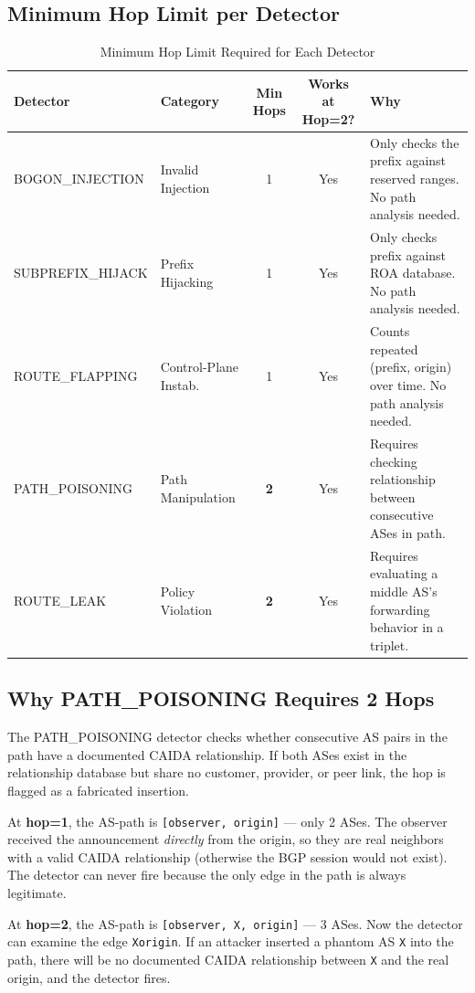 \documentclass[11pt,a4paper]{article}
\begin{document}
\subsection{Minimum Hop Limit per Detector}

\begin{table}[H]
\centering
\caption{Minimum Hop Limit Required for Each Detector}
\begin{tabularx}{\textwidth}{llccX}
\toprule
\textbf{Detector} & \textbf{Category} & \textbf{Min Hops} & \textbf{Works at Hop=2?} & \textbf{Why} \\
\midrule
BOGON\_INJECTION   & Invalid Injection       & 1 & Yes & Only checks the prefix against reserved ranges. No path analysis needed. \\
SUBPREFIX\_HIJACK  & Prefix Hijacking        & 1 & Yes & Only checks prefix against ROA database. No path analysis needed. \\
ROUTE\_FLAPPING    & Control-Plane Instab.   & 1 & Yes & Counts repeated (prefix, origin) over time. No path analysis needed. \\
PATH\_POISONING    & Path Manipulation       & \textbf{2} & Yes & Requires checking relationship between consecutive ASes in path. \\
ROUTE\_LEAK        & Policy Violation        & \textbf{2} & Yes & Requires evaluating a middle AS's forwarding behavior in a triplet. \\
\bottomrule
\end{tabularx}
\end{table}

\subsection{Why PATH\_POISONING Requires 2 Hops}

The PATH\_POISONING detector checks whether consecutive AS pairs in the path
have a documented CAIDA relationship. If both ASes exist in the relationship
database but share no customer, provider, or peer link, the hop is flagged
as a fabricated insertion.

At \textbf{hop=1}, the AS-path is \texttt{[observer, origin]} --- only 2 ASes. The
observer received the announcement \emph{directly} from the origin, so they are
real neighbors with a valid CAIDA relationship (otherwise the BGP session would
not exist). The detector can never fire because the only edge in the path is
always legitimate.

At \textbf{hop=2}, the AS-path is \texttt{[observer, X, origin]} --- 3 ASes. Now
the detector can examine the edge \texttt{X\textrightarrow origin}. If an attacker
inserted a phantom AS \texttt{X} into the path, there will be no documented CAIDA
relationship between \texttt{X} and the real origin, and the detector fires.
\end{document}
